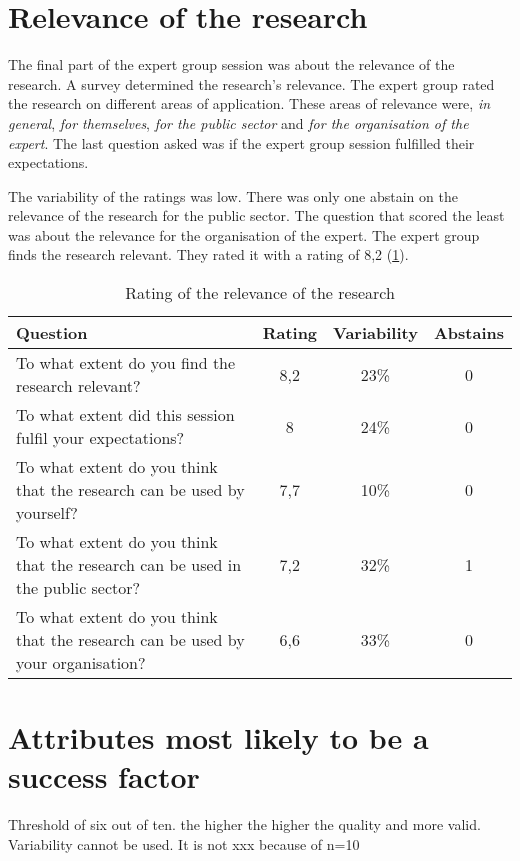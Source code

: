 \section{Relevance of the research}
\label{sec:relevanceofresearch}
The final part of the expert group session was about the relevance of the research. A survey determined the research's relevance. The expert group rated the research on different areas of application. These areas of relevance were, \textit{in general}, \textit{for themselves}, \textit{for the public sector} and \textit{for the organisation of the expert}. The last question asked was if the expert group session fulfilled their expectations.

The variability of the ratings was low. There was only one abstain on the relevance of the research for the public sector. The question that scored the least was about the relevance for the organisation of the expert. The expert group finds the research relevant. They rated it with a rating of 8,2 (\cref{tab:relevanceofresearch}).
\begin{table}[H]
	\centering
	\begin{tabular}{p{}ccc}
		\toprule
		\textbf{Question} & \textbf{Rating} & \textbf{Variability} & \textbf{Abstains} \\
		\midrule
		To what extent do you find the research relevant? & 8,2 & 23\% & 0 \\%
		To what extent did this session fulfil your expectations? & 8 & 24\% & 0 \\%
		To what extent do you think that the research can be used by yourself? & 7,7 & 10\% & 0 \\%
		To what extent do you think that the research can be used in the public sector? & 7,2 & 32\% & 1 \\%
		To what extent do you think that the research can be used by your organisation? & 6,6 & 33\% & 0 \\%
		\bottomrule
	\end{tabular}%
	\caption[Rating of the relevance of the research]{Rating of the relevance of the research}
	\label{tab:relevanceofresearch}%
\end{table}%
\section{Attributes most likely to be a success factor}
\label{sec:expertattributessf}
Threshold of six out of ten. the higher the higher the quality and more valid.
Variability cannot be used. It is not xxx because of n=10


